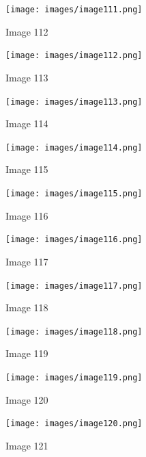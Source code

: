 \documentclass{article}%
\begin{document}
\begin{figure}[h!]%
\centering%
\texttt{[image: images/image111.png]}%
\caption{Image 112}%
\end{figure}

%


\begin{figure}[h!]%
\centering%
\texttt{[image: images/image112.png]}%
\caption{Image 113}%
\end{figure}

%


\begin{figure}[h!]%
\centering%
\texttt{[image: images/image113.png]}%
\caption{Image 114}%
\end{figure}

%


\begin{figure}[h!]%
\centering%
\texttt{[image: images/image114.png]}%
\caption{Image 115}%
\end{figure}

%


\begin{figure}[h!]%
\centering%
\texttt{[image: images/image115.png]}%
\caption{Image 116}%
\end{figure}

%


\begin{figure}[h!]%
\centering%
\texttt{[image: images/image116.png]}%
\caption{Image 117}%
\end{figure}

%


\begin{figure}[h!]%
\centering%
\texttt{[image: images/image117.png]}%
\caption{Image 118}%
\end{figure}

%


\begin{figure}[h!]%
\centering%
\texttt{[image: images/image118.png]}%
\caption{Image 119}%
\end{figure}

%


\begin{figure}[h!]%
\centering%
\texttt{[image: images/image119.png]}%
\caption{Image 120}%
\end{figure}

%


\begin{figure}[h!]%
\centering%
\texttt{[image: images/image120.png]}%
\caption{Image 121}%
\end{figure}
\end{document}
